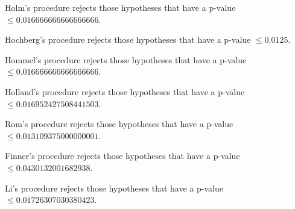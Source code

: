\documentclass[a4paper,10pt]{article}
\begin{document}
\begin{landscape}
Holm's procedure rejects those hypotheses that have a p-value $\le0.016666666666666666$.


Hochberg's procedure rejects those hypotheses that have a p-value $\le0.0125$.


Hommel's procedure rejects those hypotheses that have a p-value $\le0.016666666666666666$.


Holland's procedure rejects those hypotheses that have a p-value $\le0.016952427508441503$.


Rom's procedure rejects those hypotheses that have a p-value $\le0.013109375000000001$.


Finner's procedure rejects those hypotheses that have a p-value $\le0.0430132001682938$.


Li's procedure rejects those hypotheses that have a p-value $\le0.01726307030380423$.



\newpage


\end{landscape}
\end{document}
